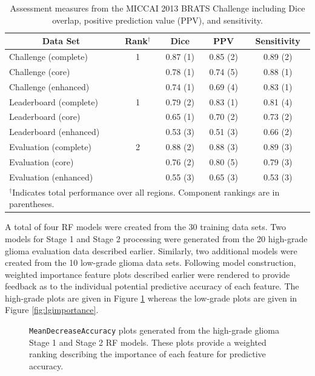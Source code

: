 \begin{table}
\caption{Assessment measures from the MICCAI 2013 BRATS Challenge including
 Dice overlap, positive prediction value (PPV), and sensitivity.}
\label{table:results}
\begin{center}
\begin{tabular*}{0.99\textwidth}{@{\extracolsep{\fill} } l c c c c}
\toprule
\multicolumn{1}{c}{ \bf Data Set} & {\bf Rank}$^\dagger$ & {\bf Dice} & {\bf PPV} & {\bf Sensitivity} \\
\midrule
Challenge (complete) & 1 & 0.87 (1) & 0.85 (2) & 0.89 (2) \\
Challenge (core) & {} & 0.78 (1) & 0.74 (5) & 0.88 (1) \\
Challenge (enhanced) & {} & 0.74 (1) & 0.69 (4) & 0.83 (1) \\
\midrule
Leaderboard (complete) &  1 & 0.79 (2) & 0.83 (1) & 0.81 (4) \\
Leaderboard (core)     & {} & 0.65 (1) & 0.70 (2) & 0.73 (2) \\
Leaderboard (enhanced) & {} & 0.53 (3) & 0.51 (3) & 0.66 (2) \\
\midrule
Evaluation (complete) &  2 & 0.88 (2) & 0.88 (3) & 0.89 (3) \\
Evaluation (core)     & {} & 0.76 (2) & 0.80 (5) & 0.79 (3) \\
Evaluation (enhanced) & {} & 0.55 (3) & 0.65 (3) & 0.53 (3) \\
\bottomrule
\multicolumn{5}{l}{\scriptsize$^\dagger$Indicates total performance
 over all regions.  Component rankings are 
in parentheses.
}
\end{tabular*}
\end{center}
\end{table}


A total of four RF models were created from the 30 training data 
sets. Two models for Stage 1 and Stage 2 processing were generated from the 
20 high-grade glioma evaluation data described earlier.  Similarly, two
additional models were created from the 10 low-grade glioma data sets.  Following
model construction, weighted importance feature plots described earlier were 
rendered to provide feedback as to the individual potential predictive accuracy
of each feature.  The high-grade plots are given in Figure \ref{fig:hgimportance}
whereas the low-grade plots are given in Figure \ref{fig:lgimportance}.

\begin{figure}
  \caption{{\tt MeanDecreaseAccuracy} plots generated from the high-grade glioma
  Stage 1 and Stage 2 RF models.  These plots provide a weighted 
  ranking describing the importance of each feature for predictive accuracy. 
  }
  \label{fig:hgimportance}
\end{figure}

